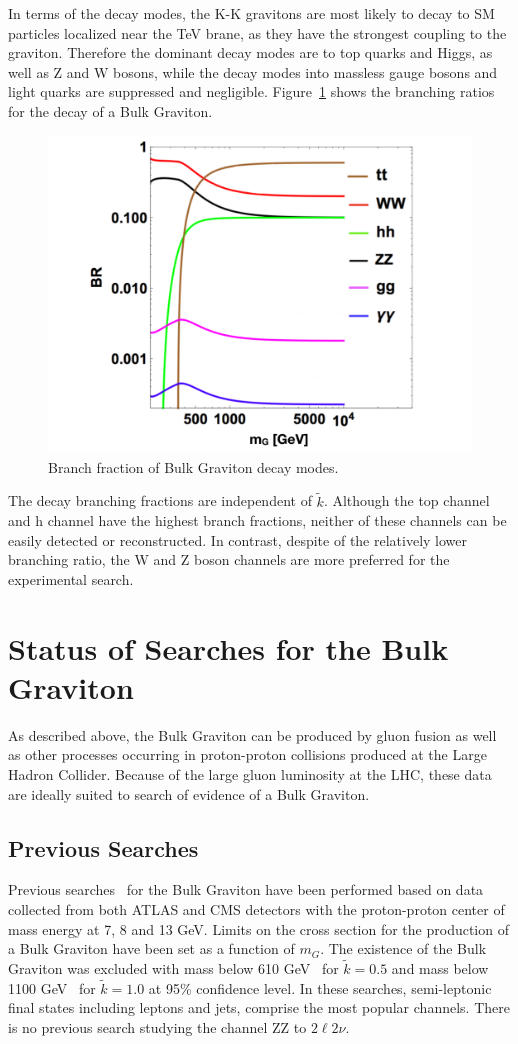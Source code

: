 In terms of the decay modes, the K-K gravitons are most likely to decay to SM particles localized near the TeV brane, as they have the strongest coupling to the graviton. Therefore the dominant decay modes are to top quarks and Higgs, as well as Z and W bosons, while the decay modes into massless gauge bosons and light quarks are suppressed and negligible. Figure~\ref{fig:intro_Gbr} shows the branching ratios for the decay of a Bulk Graviton.
\begin{figure}[htbp]
\begin{center}
\includegraphics[width=0.5\linewidth]{figures/intro_Gbr.pdf}
\caption{Branch fraction of Bulk Graviton decay modes.}
\label{fig:intro_Gbr}
\end{center}
\end{figure}
The decay branching fractions are independent of $\tilde{k}$. Although the top channel and h channel have the highest branch fractions, neither of these channels can be easily detected or reconstructed. In contrast, despite of the relatively lower branching ratio, the W and Z boson channels are more preferred for the experimental search.

\section{Status of Searches for the Bulk Graviton} 
As described above, the Bulk Graviton can be produced by gluon fusion as well as other processes occurring in proton-proton collisions produced at the Large Hadron Collider. Because of the large gluon luminosity at the LHC, these data are ideally suited to search of evidence of a Bulk Graviton.
\subsection{Previous Searches}
Previous searches~\cite{Aad:2012nev,Aad:2013wxa,Aad:2014xka,Chatrchyan:2012baa,Khachatryan:2014gha,Aaboud:2016okv} for the Bulk Graviton have been performed based on data collected from both ATLAS and CMS detectors with the proton-proton center of mass energy at 7, 8 and 13 GeV. Limits on the cross section for the production of a Bulk Graviton have been set as a function of $m_{G}$. The existence of the Bulk Graviton was excluded with mass below 610 GeV~\cite{Chatrchyan:2012baa} for $\tilde{k}=0.5$ and mass below 1100 GeV~\cite{Aaboud:2016okv} for $\tilde{k}=1.0$ at 95\% confidence level. In these searches, semi-leptonic final states including leptons and jets, comprise the most popular channels. There is no previous search studying the channel ZZ to $2\ell 2\nu$.
